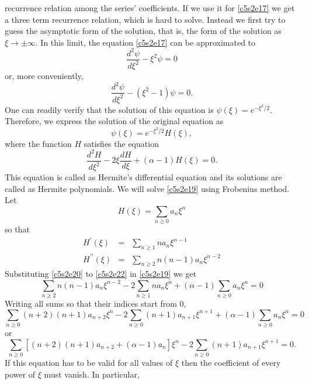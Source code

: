 recurrence relation among the series' coefficients. If we use it for 
\eqref{c5s2e17} we get a three term recurrence relation, which is hard to solve.
Instead we first try to guess the asymptotic form of the solution, that is, the
form of the solution as $\xi \rightarrow \pm\infty$. In this limit, the equation
\eqref{c5s2e17} can be approximated to
\[
\frac{d^2\psi}{d\xi^2} - \xi^2\psi = 0
\]
or, more conveniently,
\[
\frac{d^2\psi}{d\xi^2} - (\xi^2 - 1)\psi = 0.
\]
One can readily verify that the solution of this equation is $\psi(\xi) =
e^{-\xi^2/2}$. Therefore, we express the solution of the original equation as
\begin{equation}\label{c5s2e18}
\psi(\xi) = e^{-\xi^2/2}H(\xi),
\end{equation}
where the function $H$ satisfies the equation
\begin{equation}\label{c5s2e19}
\frac{d^2H}{d\xi^2} - 2\xi\frac{dH}{d\xi} + (\alpha - 1)H(\xi) = 0.
\end{equation}
This equation is called as Hermite's differential equation and its solutions are
called as Hermite polynomials. We will solve \eqref{c5s2e19} using Frobenius 
method. Let
\begin{equation}\label{c5s2e20}
H(\xi) = \sum_{n \ge 0}a_n\xi^n
\end{equation}
so that
\begin{eqnarray}
H^\prime(\xi) &=& \sum_{n \ge 1}na_n \xi^{n-1} \label{c5s2e21} \\
H^{\prime\prime}(\xi) &=& \sum_{n \ge 2}n(n-1)a_n \xi^{n-2} \label{c5s2e22}
\end{eqnarray}
Substituting \eqref{c5s2e20} to \eqref{c5s2e22} in \eqref{c5s2e19} we get
\begin{equation}\label{c5s2e23}
\sum_{n \ge 2}n(n-1)a_n \xi^{n-2} - 2\sum_{n \ge 1}na_n \xi^n + (\alpha - 1)
\sum_{n \ge 0}a_n\xi^n = 0
\end{equation}
Writing all sums so that their indices start from $0$,
\begin{equation}\label{c5s2e24}
\sum_{n \ge 0}(n+2)(n+1)a_{n+2} \xi^n - 2\sum_{n \ge 0}(n+1)a_{n+1} \xi^{n+1} + 
(\alpha - 1)\sum_{n \ge 0}a_n\xi^n = 0
\end{equation}
or
\begin{equation}\label{c5s2e25}
\sum_{n \ge 0}\left[(n+2)(n+1)a_{n+2} + (\alpha - 1)a_n\right]\xi^n - 
2\sum_{n \ge 0}(n+1)a_{n+1} \xi^{n+1} = 0.
\end{equation}
If this equation has to be valid for all values of $\xi$ then the coefficient of
every power of $\xi$ must vanish. In particular,
